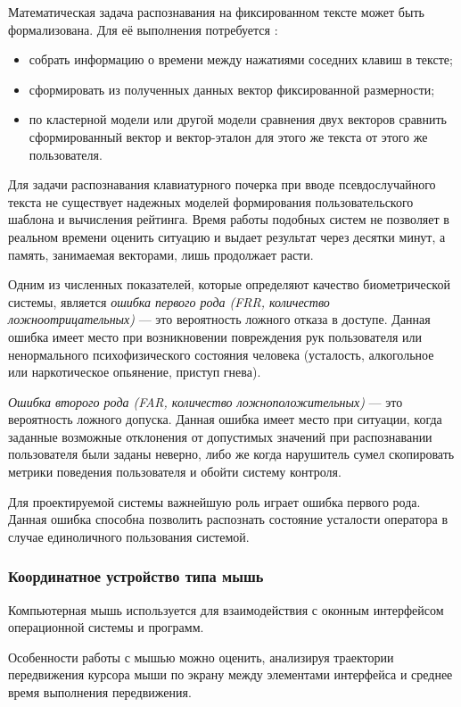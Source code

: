 Математическая задача распознавания на фиксированном тексте может быть формализована. Для её выполнения потребуется \cite{keystroke}:
\begin{itemize}
\item собрать информацию о времени между нажатиями соседних клавиш в тексте;
\item сформировать из полученных данных вектор фиксированной размерности;
\item по кластерной модели или другой модели сравнения двух векторов сравнить сформированный вектор и вектор-эталон для этого же текста от этого же пользователя.
\end{itemize}

Для задачи распознавания клавиатурного почерка при вводе псевдослучайного текста не существует надежных моделей формирования пользовательского шаблона и вычисления рейтинга. Время работы подобных систем не позволяет в реальном времени оценить ситуацию и выдает результат через десятки минут, а память, занимаемая векторами, лишь продолжает расти. \cite{keystroke}

Одним из численных показателей, которые определяют качество биометрической системы, является \textit{ошибка первого рода (FRR, количество ложноотрицательных)} --- это вероятность ложного отказа в доступе. Данная ошибка имеет место при возникновении повреждения рук пользователя или ненормального психофизического состояния человека (усталость, алкогольное или наркотическое опьянение, приступ гнева).\cite{keystroke}

\textit{Ошибка второго рода (FAR, количество ложноположительных)} --- это вероятность ложного допуска. Данная ошибка имеет место при ситуации, когда заданные возможные отклонения от допустимых значений при распознавании пользователя были заданы неверно, либо же когда нарушитель сумел скопировать метрики поведения пользователя и обойти систему контроля. \cite{keystroke}

Для проектируемой системы важнейшую роль играет ошибка первого рода. Данная ошибка способна позволить распознать состояние усталости оператора в случае единоличного пользования системой.

\subsubsection{Координатное устройство типа мышь}
Компьютерная мышь используется для взаимодействия с оконным интерфейсом операционной системы и программ.

Особенности работы с мышью можно оценить, анализируя траектории передвижения курсора мыши по экрану между элементами интерфейса и среднее время выполнения передвижения. \cite{recognitionOfPsycho}

